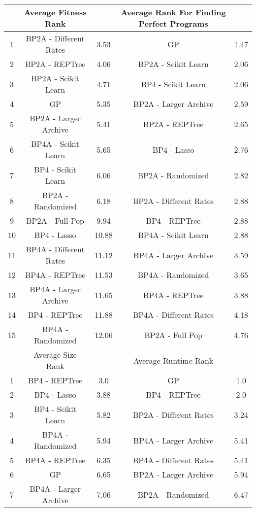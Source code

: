 \begin{table*}[ht]
\centering
\begin{adjustbox}{width=1\textwidth}
\small
\begin{tabular}{ c | c c | c c }
\hline\hline
& Average Fitness Rank & & Average Rank For Finding Perfect Programs & \\
\hline
1 & BP2A - Different Rates & 3.53 & GP & 1.47 \\
2 & BP2A - REPTree & 4.06 & BP2A - Scikit Learn & 2.06 \\
3 & BP2A - Scikit Learn & 4.71 & BP4 - Scikit Learn & 2.06 \\
4 & GP & 5.35 & BP2A - Larger Archive & 2.59 \\
5 & BP2A - Larger Archive & 5.41 & BP2A - REPTree & 2.65 \\
6 & BP4A - Scikit Learn & 5.65 & BP4 - Lasso & 2.76 \\
7 & BP4 - Scikit Learn & 6.06 & BP2A - Randomized & 2.82 \\
8 & BP2A - Randomized & 6.18 & BP2A - Different Rates & 2.88 \\
9 & BP2A - Full Pop & 9.94 & BP4 - REPTree & 2.88 \\
10 & BP4 - Lasso & 10.88 & BP4A - Scikit Learn & 2.88 \\
11 & BP4A - Different Rates & 11.12 & BP4A - Larger Archive & 3.59 \\
12 & BP4A - REPTree & 11.53 & BP4A - Randomized & 3.65 \\
13 & BP4A - Larger Archive & 11.65 & BP4A - REPTree & 3.88 \\
14 & BP4 - REPTree & 11.88 & BP4A - Different Rates & 4.18 \\
15 & BP4A - Randomized & 12.06 & BP2A - Full Pop & 4.76 \\
\hline\hline
& Average Size Rank & & Average Runtime Rank & \\
 \hline
1 & BP4 - REPTree & 3.0 & GP & 1.0 \\
2 & BP4 - Lasso & 3.88 & BP4 - REPTree & 2.0 \\
3 & BP4 - Scikit Learn & 5.82 & BP2A - Different Rates & 3.24 \\
4 & BP4A - Randomized & 5.94 & BP4A - Larger Archive & 5.41 \\
5 & BP4A - REPTree & 6.35 & BP4A - Different Rates & 5.41 \\
6 & GP & 6.65 & BP2A - Larger Archive & 5.94 \\
7 & BP4A - Larger Archive & 7.06 & BP2A - Randomized & 6.47 \\

\end{tabular}
\end{adjustbox}
\end{table*}

